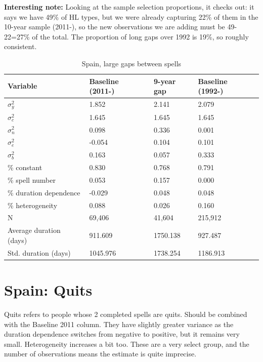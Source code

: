 \documentclass[12pt]{article}
\theoremstyle{definition}
\theoremstyle{remark}
\begin{document}
\begin{appendices}
\textcolor{uv}{\textbf{Interesting note:} Looking at the sample selection proportions, it checks out: it says we have 49\% of HL types, but we were already capturing 22\% of them in the 10-year sample (2011-), so the new observations we are adding must be 49-22=27\% of the total. The proportion of long gaps over 1992 is 19\%, so roughly consistent.}\\

\begin{table}[htbb!]\label{tab:results_spain_BigGap}
    \centering
    \caption{Spain, large gaps between spells}
\begin{tabular}{llll}
\toprule
Variable & Baseline (2011-) & 9-year gap & Baseline (1992-) \\
\midrule
$\sigma^{2}_y$ & 1.852 & 2.141 & 2.079 \\
$\sigma^{2}_c$ & 1.645 & 1.645 & 1.645 \\
$\sigma^{2}_n$ & 0.098 & 0.336 & 0.001 \\
$\sigma^{2}_e$ & -0.054 & 0.104 & 0.101 \\
$\sigma^{2}_b$ & 0.163 & 0.057 & 0.333 \\
\midrule
\% constant & 0.830 & 0.768 & 0.791 \\
\% spell number & 0.053 & 0.157 & 0.000 \\
\% duration dependence & -0.029 & 0.048 & 0.048 \\
\% heterogeneity & 0.088 & 0.026 & 0.160 \\
\hline \hline
N & 69,406 & 41,604 & 215,912 \\
Average duration (days) & 911.609 & 1750.138 & 927.487 \\
Std. duration (days) & 1045.976 & 1738.254 & 1186.913 \\
\bottomrule
\end{tabular}
\end{table}


\section{Spain: Quits}

\textcolor{uv}{Quits refers to people whose 2 completed spells are quits. Should be combined with the Baseline 2011 column. They have slightly greater variance as the duration dependence switches from negative to positive, but it remains very small. Heterogeneity increases a bit too. These are a very select group, and the number of observations means the estimate is quite imprecise.}


\end{appendices}
\end{document}
